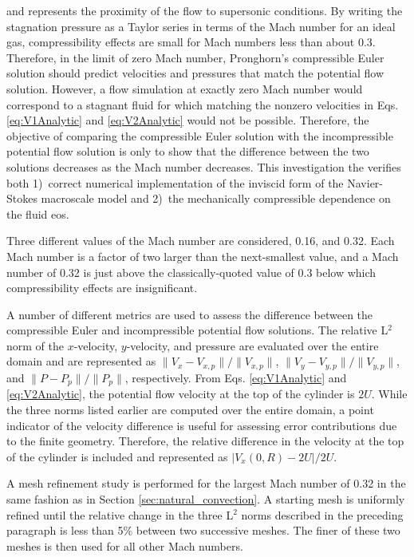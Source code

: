 \noindent and represents the proximity of the flow to supersonic conditions. By writing the stagnation pressure as a Taylor series in terms of the Mach number for an ideal gas, compressibility effects are small for Mach numbers less than about 0.3. Therefore, in the limit of zero Mach number, Pronghorn's compressible Euler solution should predict velocities and pressures that match the potential flow solution. However, a flow simulation at exactly zero Mach number would correspond to a stagnant fluid for which matching the nonzero velocities in Eqs. \eqref{eq:V1Analytic} and \eqref{eq:V2Analytic} would not be possible. Therefore, the objective of comparing the compressible Euler solution with the incompressible potential flow solution is only to show that the difference between the two solutions decreases as the Mach number decreases. This investigation the verifies both 1)~correct numerical implementation of the inviscid form of the Navier-Stokes macroscale model and 2)~the mechanically compressible dependence on the fluid \gls{eos}.

Three different values of the Mach number are considered, 0.16, and 0.32. Each Mach number is a factor of two larger than the next-smallest value, and a Mach number of 0.32 is just above the classically-quoted value of 0.3 below which compressibility effects are insignificant.

A number of different metrics are used to assess the difference between the compressible Euler and incompressible potential flow solutions. The relative L$^2$ norm of the $x$-velocity, $y$-velocity, and pressure are evaluated over the entire domain and are represented as \(\|V_x-V_{x,p}\|/\|V_{x,p}\|\), \(\|V_y-V_{y,p}\|/\|V_{y,p}\|\), and \(\|P-P_p\|/\|P_p\|\), respectively. From Eqs. \eqref{eq:V1Analytic} and \eqref{eq:V2Analytic}, the potential flow velocity at the top of the cylinder is \(2U\). While the three norms listed earlier are computed over the entire domain, a point indicator of the velocity difference is useful for assessing error contributions due to the finite geometry. Therefore, the relative difference in the velocity at the top of the cylinder is included and represented as \(|V_x(0, R)-2U|/2U\).

A mesh refinement study is performed for the largest Mach number of 0.32 in the same fashion as in Section \ref{sec:natural_convection}. A starting mesh is uniformly refined until the relative change in the three L$^2$ norms described in the preceding paragraph is less than 5\% between two successive meshes. The finer of these two meshes is then used for all other Mach numbers.

